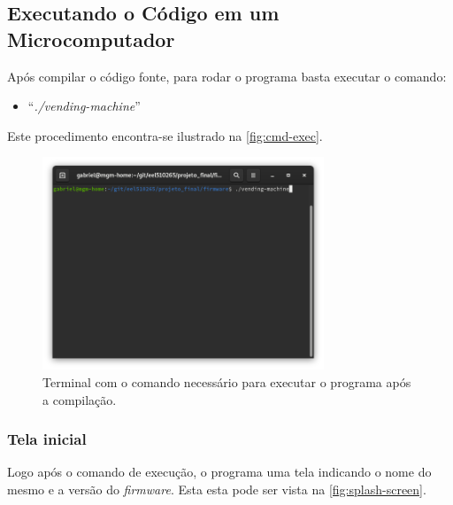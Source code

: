 \subsection{Executando o Código em um Microcomputador}

Após compilar o código fonte, para rodar o programa basta executar o comando:

\begin{itemize}
    \item ``\textit{./vending-machine}''
\end{itemize}

Este procedimento encontra-se ilustrado na \autoref{fig:cmd-exec}.

\begin{figure}[!ht]
    \begin{center}
        \includegraphics[width=0.75\textwidth]{figures/window-cmd-exec.png}
        \caption{Terminal com o comando necessário para executar o programa após a compilação.}
        \label{fig:cmd-exec}
    \end{center}
\end{figure}

\subsubsection{Tela inicial}

Logo após o comando de execução, o programa uma tela indicando o nome do mesmo e a versão do \textit{firmware}. Esta esta pode ser vista na \autoref{fig:splash-screen}.

